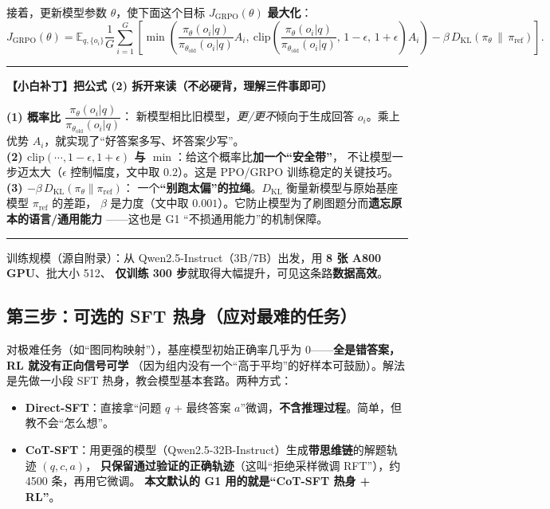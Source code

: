 \documentclass[11pt,UTF8,fontset=fandol]{ctexart}
\newenvironment{tip}[1]{%
  \par\smallskip\noindent\rule{\linewidth}{0.4pt}\par\nobreak
  \noindent\textbf{【小白补丁】#1}\par\nobreak\noindent\ignorespaces
}{%
  \par\noindent\rule{\linewidth}{0.4pt}\par\smallskip
}
\begin{document}
接着，更新模型参数 $\theta$，使下面这个目标 $J_{\mathrm{GRPO}}(\theta)$ \textbf{最大化}：
\begin{equation*}
  J_{\mathrm{GRPO}}(\theta) = \mathbb{E}_{q,\{o_i\}}
  \frac{1}{G}\sum_{i=1}^{G}\left[
  \min\!\left(\frac{\pi_\theta(o_i|q)}{\pi_{\theta_{\mathrm{old}}}(o_i|q)}A_i,\
  \mathrm{clip}\!\left(\frac{\pi_\theta(o_i|q)}{\pi_{\theta_{\mathrm{old}}}(o_i|q)},\,1-\epsilon,\,1+\epsilon\right)A_i\right)
  - \beta\, D_{\mathrm{KL}}(\pi_\theta\,\|\,\pi_{\mathrm{ref}})\right]. \tag{2}
\end{equation*}

\begin{tip}{把公式 (2) 拆开来读（不必硬背，理解三件事即可）}
\textbf{(1) 概率比 $\dfrac{\pi_\theta(o_i|q)}{\pi_{\theta_{\mathrm{old}}}(o_i|q)}$}：
新模型相比旧模型，\emph{更/更不}倾向于生成回答 $o_i$。乘上优势 $A_i$，就实现了“好答案多写、坏答案少写”。\\
\textbf{(2) $\mathrm{clip}(\cdots,1-\epsilon,1+\epsilon)$ 与 $\min$}：给这个概率比\textbf{加一个“安全带”}，
不让模型一步迈太大（$\epsilon$ 控制幅度，文中取 $0.2$）。这是 PPO/GRPO 训练稳定的关键技巧。\\
\textbf{(3) $-\beta\,D_{\mathrm{KL}}(\pi_\theta\|\pi_{\mathrm{ref}})$}：
一个\textbf{“别跑太偏”的拉绳}。$D_{\mathrm{KL}}$ 衡量新模型与原始基座模型 $\pi_{\mathrm{ref}}$ 的差距，
$\beta$ 是力度（文中取 $0.001$）。它防止模型为了刷图题分而\textbf{遗忘原本的语言/通用能力}
——这也是 G1 “不损通用能力”的机制保障。
\end{tip}

训练规模（源自附录）：从 Qwen2.5-Instruct（3B/7B）出发，用 \textbf{8 张 A800 GPU}、批大小 512、
\textbf{仅训练 300 步}就取得大幅提升，可见这条路\textbf{数据高效}。

\subsection{第三步：可选的 SFT 热身（应对最难的任务）}

对极难任务（如“图同构映射”），基座模型初始正确率几乎为 0——\textbf{全是错答案，RL 就没有正向信号可学}
（因为组内没有一个“高于平均”的好样本可鼓励）。解法是先做一小段 SFT 热身，教会模型基本套路。两种方式：
\begin{itemize}[leftmargin=2em]
  \item \textbf{Direct-SFT}：直接拿“问题 $q$ + 最终答案 $a$”微调，\textbf{不含推理过程}。简单，但教不会“怎么想”。
  \item \textbf{CoT-SFT}：用更强的模型（Qwen2.5-32B-Instruct）生成\textbf{带思维链}的解题轨迹 $(q,c,a)$，
        \textbf{只保留通过验证的正确轨迹}（这叫“拒绝采样微调 RFT”），约 4500 条，再用它微调。
        \textbf{本文默认的 G1 用的就是“CoT-SFT 热身 + RL”}。
\end{itemize}
\end{document}
